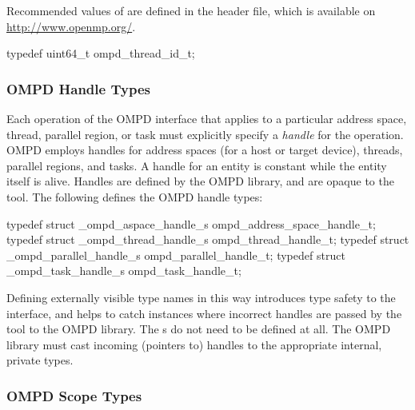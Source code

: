 Recommended values of  are defined in the 
header file, which is available on \url{http://www.openmp.org/}.

\label{ompd:ompd_thread_id_t}
\format

\begin{ccppspecific}
\begin{ompSyntax}
typedef uint64_t ompd_thread_id_t;
\end{ompSyntax}
\end{ccppspecific}


\subsubsection{OMPD Handle Types}
\label{subsubsec:ompd_address_space_handle_t}
\label{subsubsec:ompd_thread_handle_t}
\label{subsubsec:ompd_parallel_handle_t}
\label{subsubsec:ompd_task_handle_t}

Each operation of the OMPD interface that applies to a particular address space, thread, parallel
region, or task must explicitly specify
a \emph{handle} for the operation.
OMPD employs handles for address spaces (for a host or target device), threads, parallel regions,
and tasks. A handle for an entity is constant while the entity itself is alive. Handles are defined by
the OMPD library, and are opaque to the tool. The following defines the OMPD
handle types:

\format

\begin{ccppspecific}
\begin{ompSyntax}
typedef struct _ompd_aspace_handle_s
   ompd_address_space_handle_t;
typedef struct _ompd_thread_handle_s ompd_thread_handle_t;
typedef struct _ompd_parallel_handle_s ompd_parallel_handle_t;
typedef struct _ompd_task_handle_s ompd_task_handle_t;
\end{ompSyntax}
\end{ccppspecific}


Defining externally visible type names in this way introduces type safety to the interface, and helps
to catch instances where incorrect handles are passed by the tool to the OMPD
library. The s do not need to be defined at all. The OMPD library
must cast incoming (pointers to) handles to the appropriate internal, private types.

\subsubsection{OMPD Scope Types}
\label{subsubsec:ompd_scope_t}


